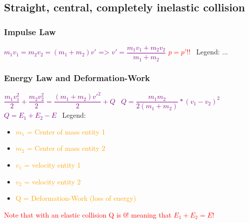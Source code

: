 \documentclass[main.tex,fontsize=8pt,paper=a4,paper=portrait,DIV=calc,]{scrartcl}
\begin{document}
\begin{multicols*}{2}
\subsection{Straight, central, completely inelastic collision}

\subsubsection{Impulse Law}
\vspace{2mm}
\large \textcolor{purple}{\( m_1v_1 = m_2v_2 = (m_1 + m_2 )v' \text{ => } v' = \dfrac{m_1v_1 + m_2v_2}{m_1 + m_2}\)}\newline
\textcolor{red}{\( p = p' \)!!}\newline
\normalsize \, \newline
Legend:\newline
...

\subsubsection{Energy Law and Deformation-Work}
\vspace{2mm}
\large \textcolor{purple}{\( \dfrac{m_1v_1^2}{2} + \dfrac{m_2v_2^2}{2} = \dfrac{(m_1 + m_2)v'^2}{2} + Q \)}\newline
\, \newline
\textcolor{purple}{\(Q = \dfrac{m_1m_2}{2(m_1+m_2)}*(v_1 -v_2)^2\)}\newline
\, \newline
\textcolor{purple}{\( Q = E_1 + E_2 - E \)}
\normalsize \, \newline
Legend:\newline
\begin{itemize}
\item \textcolor{orange}{\(m_1\) = Center of mass entity 1}
\item \textcolor{orange}{\(m_2\) = Center of mass entity 2}
\item \textcolor{orange}{\(v_1\) = velocity entity 1}
\item \textcolor{orange}{\(v_2\) = velocity entity 2}
\item \textcolor{orange}{Q = Deformation-Work (loss of energy)}
\end{itemize}
\textcolor{red}{Note that with an elastic collision Q is 0! meaning that \(E_1 + E_2 = E!\)}



\end{multicols*}
\end{document}
